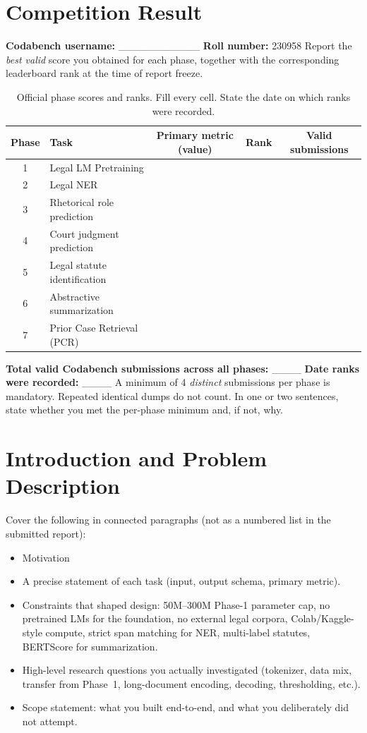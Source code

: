 \documentclass[11pt, oneside]{article}
\begin{document}
\section{Competition Result}
\noindent
\textbf{Codabench username:} \_\_\_\_\_\_\_\_\_\_\_
\hfill
\textbf{Roll number:} 230958
\medskip
\noindent
Report the \emph{best valid} score you obtained for each phase, together with the corresponding leaderboard rank at the time of report freeze. 
\begin{table}[H]
\centering
\caption{Official phase scores and ranks. Fill every cell. State the date on which ranks were recorded.}
\label{tab:leaderboard}
\begin{tabular}{clccc}
\toprule
Phase & Task & Primary metric (value) & Rank & Valid submissions \\
\midrule
1 & Legal LM Pretraining &  &  &  \\
2 & Legal NER &  &  &  \\
3 & Rhetorical role prediction &  &  &  \\
4 & Court judgment prediction &  &  &  \\
5 & Legal statute identification &  &  &  \\
6 & Abstractive summarization &  &  &  \\
7 & Prior Case Retrieval (PCR) &  &  &  \\
\bottomrule
\end{tabular}
\end{table}
\noindent
\textbf{Total valid Codabench submissions across all phases:} \_\_\_\_
\quad
\textbf{Date ranks were recorded:} \_\_\_\_
\medskip
A minimum of 4 \emph{distinct} submissions per phase is mandatory. Repeated identical dumps do not count. In one or two sentences, state whether you met the per-phase minimum and, if not, why.
\section{Introduction and Problem Description}
Cover the following in connected paragraphs (not as a numbered list in the submitted report):
\begin{itemize}[leftmargin=*]
    \item Motivation
    \item A precise statement of each task (input, output schema, primary metric).
    \item Constraints that shaped design: 50M--300M Phase-1 parameter cap, no pretrained LMs for the foundation, no external legal corpora, Colab/Kaggle-style compute, strict span matching for NER, multi-label statutes, BERTScore for summarization.
    \item High-level research questions you actually investigated (tokenizer, data mix, transfer from Phase~1, long-document encoding, decoding, thresholding, etc.).
    \item Scope statement: what you built end-to-end, and what you deliberately did not attempt.
\end{itemize}
\end{document}
